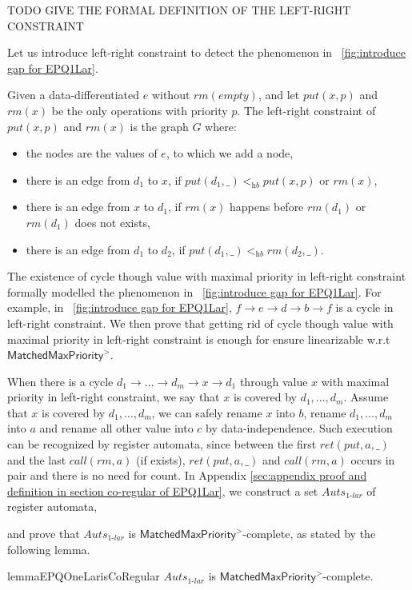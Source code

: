 TODO GIVE THE FORMAL DEFINITION OF THE LEFT-RIGHT CONSTRAINT
{\color {blue}Let us introduce left-right constraint to detect the phenomenon in \figurename~\ref{fig:introduce gap for EPQ1Lar}.

\begin{definition}\label{def:left-right constraint for matched put and rm operations}
Given a data-differentiated $e$ without $\textit{rm}(\textit{empty})$, and let $\textit{put}(x,p)$ and $\textit{rm}(x)$ be the only operations with priority $p$. The left-right constraint of $\textit{put}(x,p)$ and $\textit{rm}(x)$ is the graph $G$ where:

\begin{itemize}
\item the nodes are the values of $e$, to which we add a node,
\item there is an edge from $d_1$ to $x$, if $\textit{put}(d_1,\_) <_{\textit{hb}} \textit{put}(x,p)$ or $\textit{rm}(x)$,
\item there is an edge from $x$ to $d_1$, if $\textit{rm}(x)$ happens before $\textit{rm}(d_1)$ or $\textit{rm}(d_1)$ does not exists,
\item there is an edge from $d_1$ to $d_2$, if $\textit{put}(d_1,\_) <_{\textit{hb}} \textit{rm}(d_2,\_)$.
\end{itemize} 
\end{definition}


The existence of cycle though value with maximal priority in left-right constraint formally modelled the phenomenon in \figurename~\ref{fig:introduce gap for EPQ1Lar}. For example, in \figurename~\ref{fig:introduce gap for EPQ1Lar}, $f \rightarrow e \rightarrow d \rightarrow b \rightarrow f$ is a cycle in left-right constraint. We then prove that getting rid of cycle though value with maximal priority in left-right constraint is enough for ensure linearizable w.r.t $\mathsf{MatchedMaxPriority}^{>}$.
}

When there is a cycle $d_1 \rightarrow \ldots \rightarrow d_m \rightarrow x \rightarrow d_1$ through value $x$ with maximal priority in left-right constraint, we say that $x$ is covered by $d_1,\ldots,d_m$. Assume that $x$ is covered by $d_1,\ldots,d_m$, we can safely rename $x$ into $b$, rename $d_1,\ldots,d_m$ into $a$ and rename all other value into $c$ by data-independence. Such execution can be recognized by register automata, since between the first $\textit{ret}(\textit{put},a,\_)$ and the last $\textit{call}(\textit{rm},a)$ (if exists), $\textit{ret}(\textit{put},a,\_)$ and $\textit{call}(\textit{rm},a)$ occurs in pair and there is no need for count. In Appendix \ref{sec:appendix proof and definition in section co-regular of EPQ1Lar}, we construct a set $\textit{Auts}_{\textit{1-lar}}$ of register automata, {\color {blue}and prove that $\textit{Auts}_{\textit{1-lar}}$ is $\mathsf{MatchedMaxPriority}^{>}$-complete, as stated by the following lemma.

\begin{restatable}{lemma}{EPQOneLarisCoRegular}
\label{lemma:EPQ1Lar is co-regular}
$\textit{Auts}_{\textit{1-lar}}$ is $\mathsf{MatchedMaxPriority}^{>}$-complete.
\end{restatable}
} 

